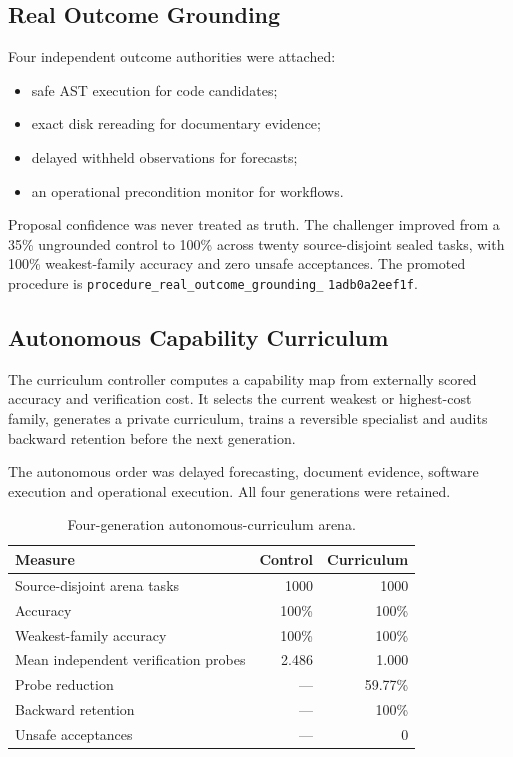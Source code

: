 \subsection{Real Outcome Grounding}

Four independent outcome authorities were attached:
\begin{itemize}
  \item safe AST execution for code candidates;
  \item exact disk rereading for documentary evidence;
  \item delayed withheld observations for forecasts;
  \item an operational precondition monitor for workflows.
\end{itemize}
Proposal confidence was never treated as truth.  The challenger improved from a
35\% ungrounded control to 100\% across twenty source-disjoint sealed tasks,
with 100\% weakest-family accuracy and zero unsafe acceptances.  The promoted
procedure is
\texttt{procedure\_real\_outcome\_grounding\_}\allowbreak
\texttt{1adb0a2eef1f}.

\subsection{Autonomous Capability Curriculum}

The curriculum controller computes a capability map from externally scored
accuracy and verification cost.  It selects the current weakest or
highest-cost family, generates a private curriculum, trains a reversible
specialist and audits backward retention before the next generation.

The autonomous order was delayed forecasting, document evidence, software
execution and operational execution.  All four generations were retained.

\begin{table}[ht]
\centering
\begin{tabular}{lrr}
\toprule
Measure & Control & Curriculum \\
\midrule
Source-disjoint arena tasks & 1000 & 1000 \\
Accuracy & 100\% & 100\% \\
Weakest-family accuracy & 100\% & 100\% \\
Mean independent verification probes & 2.486 & 1.000 \\
Probe reduction & --- & 59.77\% \\
Backward retention & --- & 100\% \\
Unsafe acceptances & --- & 0 \\
\bottomrule
\end{tabular}
\caption{Four-generation autonomous-curriculum arena.}
\end{table}

